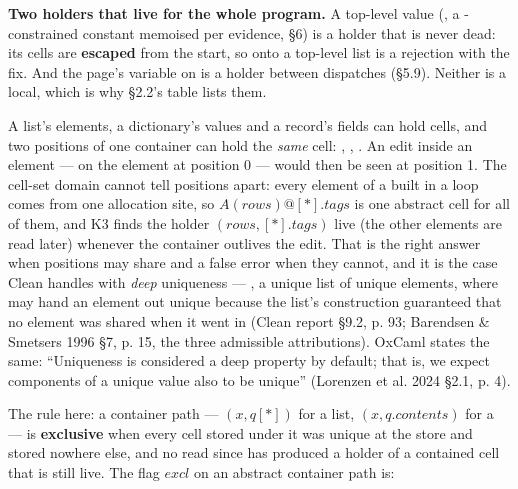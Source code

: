 \textbf{Two holders that live for the whole program.} A top-level value (, a - constrained constant memoised per evidence,  §6) is a holder that is never dead: its cells are \textbf{escaped} from the start, so \code{[ x, …defaults ]} onto a top-level list is a rejection with the  fix. And the page's  variable on  is a holder between dispatches (§5.9). Neither is a local, which is why §2.2's table lists them.


A list's elements, a dictionary's values and a record's fields can hold cells, and two positions of one container can hold the \emph{same} cell: \code{[ r, r ]}, , . An edit inside an element —  on the element at position 0 — would then be seen at position 1. The cell-set domain cannot tell positions apart: every element of a  built in a loop comes from one allocation site, so $A(\mathit{rows})@[\ast ].\mathit{tags}$ is one abstract cell for all of them, and K3 finds the holder $(\mathit{rows},\allowbreak{}[\ast ].\mathit{tags})$ live (the other elements are read later) whenever the container outlives the edit. That is the right answer when positions may share and a false error when they cannot, and it is the case Clean handles with \emph{deep} uniqueness — \code{*[*a]}, a unique list of unique elements, where  may hand an element out unique because the list's construction guaranteed that no element was shared when it went in (Clean report §9.2, p. 93; Barendsen \& Smetsers 1996 §7, p. 15, the three admissible  attributions). OxCaml states the same: “Uniqueness is considered a deep property by default; that is, we expect components of a unique value also to be unique” (Lorenzen et al. 2024 §2.1, p. 4).

The rule here: a container path — $(x,\allowbreak{}q[\ast ])$ for a list, $(x,\allowbreak{}q.\mathit{contents})$ for a  — is \textbf{exclusive} when every cell stored under it was unique at the store and stored nowhere else, and no read since has produced a holder of a contained cell that is still live. The flag $\mathit{excl}$ on an abstract container path is:

